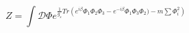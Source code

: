 \begin{equation}
Z=\int \mathcal{D}\Phi 
e^{\frac1{g_s} Tr \left( e^{i\beta}\Phi_1\Phi_2\Phi_3-e^{-i\beta}\Phi_1\Phi_3\Phi_2)-
m\sum \Phi_i^2 \right)}
\end{equation}

